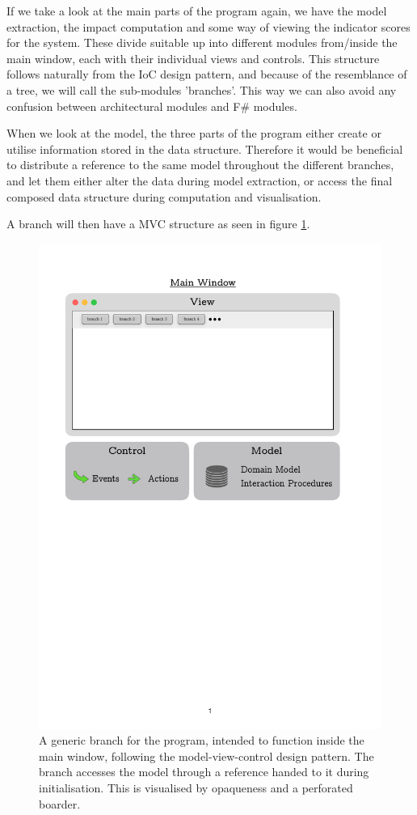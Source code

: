 If we take a look at the main parts of the program again, we have the model extraction, the impact computation and some way of viewing the indicator scores for the system. These divide suitable up into different modules from/inside the main window, each with their individual views and controls. This structure follows naturally from the IoC design pattern, and because of the resemblance of a tree, we will call the sub-modules 'branches'. This way we can also avoid any confusion between architectural modules and F\# modules.

When we look at the model, the three parts of the program either create or utilise information stored in the data structure. Therefore it would be beneficial to distribute a reference to the same model throughout the different branches, and let them either alter the data during model extraction, or access the final composed data structure during computation and visualisation.

A branch will then have a MVC structure as seen in figure \ref{fig:Architecture-Branch}.

\begin{figure}[H]
    \centering
    \includegraphics[page=2, width=0.6\linewidth]{.Figures/Architecture.pdf}
    \caption{A generic branch for the program, intended to function inside the main window, following the model-view-control design pattern. The branch accesses the model through a reference handed to it during initialisation. This is visualised by opaqueness and a perforated boarder.}
    \label{fig:Architecture-Branch}
\end{figure}

